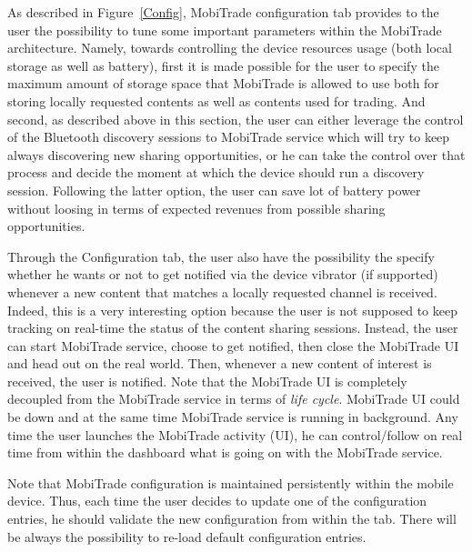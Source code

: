 As described in Figure~\ref{Config}, MobiTrade configuration tab provides to the user the possibility to tune some important parameters within the MobiTrade architecture. Namely, towards controlling the device resources usage (both local storage as well as battery), first it is made possible for the user to specify the maximum amount of storage space that MobiTrade is allowed to use both for storing locally requested contents as well as contents used for trading. And second, as described above in this section, the user can either leverage the control of the Bluetooth discovery sessions to MobiTrade service which will try to keep always discovering new sharing opportunities, or he can take the control over that process and decide the moment at which the device should run a discovery session. Following the latter option, the user can save lot of battery power without loosing in terms of expected revenues from possible sharing opportunities.

Through the Configuration tab, the user also have the possibility the specify whether he wants or not to get notified via the device vibrator (if supported) whenever a new content that matches a locally requested channel is received. Indeed, this is a very interesting option because the user is not supposed to keep tracking on real-time the status of the content sharing sessions. Instead, the user can start MobiTrade service, choose to get notified, then close the MobiTrade UI and head out on the real world. Then, whenever a new content of interest is received, the user is notified. Note that the MobiTrade UI is completely decoupled from the MobiTrade service in terms of \emph{life cycle}. MobiTrade UI could be down and at the same time MobiTrade service is running in background. Any time the user launches the MobiTrade activity (UI), he can control/follow on real time from within the dashboard what is going on with the MobiTrade service.

Note that MobiTrade configuration is maintained persistently within the mobile device. Thus, each time the user decides to update one of the configuration entries, he should validate the new configuration from within the tab. There will be always the possibility to re-load default configuration entries.

